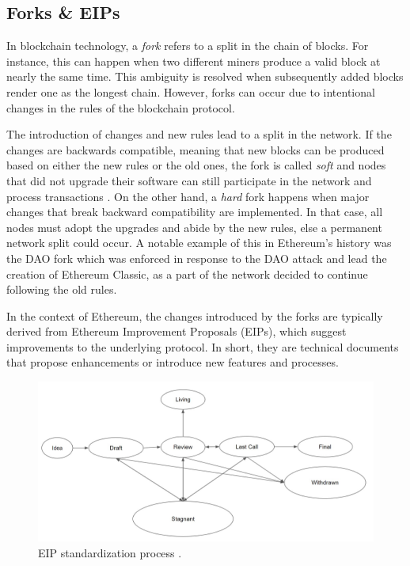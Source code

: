 \subsection{Forks \& EIPs}\label{sec:gas}
In blockchain technology, a \textit{fork} refers to a split in the chain of blocks. For instance, this can happen when two different miners produce a valid block at nearly the same time. This ambiguity is resolved when subsequently added blocks render one as the longest chain. However, forks can occur due to intentional changes in the rules of the blockchain protocol. 

The introduction of changes and new rules lead to a split in the network. If the changes are backwards compatible, meaning that new blocks can be produced based on either the new rules or the old ones, the fork is called \textit{soft} and nodes that did not upgrade their software can still participate in the network and process transactions \citep{etherscaninformationcenter_2022}. On the other hand, a \textit{hard} fork happens when major changes that break backward compatibility are implemented. In that case, all nodes must adopt the upgrades and abide by the new rules, else a permanent network split could occur. A notable example of this in Ethereum's history was the DAO fork \citep{ethereumfoundation_2023} which was enforced in response to the DAO attack \citep{vujicic_2018} and lead the creation of Ethereum Classic, as a part of the network decided to continue following the old rules.

In the context of Ethereum, the changes introduced by the forks are typically derived from Ethereum Improvement Proposals (EIPs), which suggest improvements to the underlying protocol. In short, they are technical documents that propose enhancements or introduce new features and processes. 

\begin{figure}[htbp]
\centerline{\includegraphics[width=\textwidth]{figs/eip_stages.jpg}}
\caption{EIP standardization process \citep{ethereumfoundation_2023b}.}
\label{fig:eip_stages}
\end{figure}

